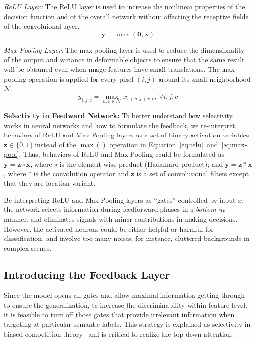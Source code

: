 \emph{ReLU Layer:}
The ReLU layer is used to increase the nonlinear properties of the decision function and of the overall network without affecting the receptive fields of the convoluional layer.
\begin{equation}
\mathbf{y} = \max (\mathbf{0}, \mathbf{x})
\label{eq:relu}
\end{equation}

\emph{Max-Pooling Layer:}
The max-pooling layer is used to reduce the dimensionality of the output and variance in deformable objects to ensure that the same result will be obtained even when image features have small translations. The max-pooling operation is applied for every pixel $(i,j)$ around its small neighborhood $\mathcal{N}$.
\begin{equation}
y_{i,j,c} = \max_{u,v \in \mathcal{N}} x_{i+u, j+v, c},\ \forall i, j, c
\label{eq:max-pool}
\end{equation}


\textbf{Selectivity in Feedward Network:}
To better understand how selectivity works in neural networks and how to formulate the feedback, we re-interpret behaviors of ReLU and Max-Pooling layers as a set of binary activation variables $\mathbf{z} \in \{0,1\}$ instead of the $\max()$ operation in Equation~\ref{eq:relu}~and~\ref{eq:max-pool}. Thus, behaviors of ReLU and Max-Pooling could be formulated as $\mathbf{y} = \mathbf{z} \circ \mathbf{x}$, where $\circ$ is the element wise product (Hadamard product); and $\mathbf{y} = \mathbf{z} * \mathbf{x}$, where $*$ is the convolution operator and $\mathbf{z}$ is a set of convolutional filters except that they are location variant.

Be interpreting ReLU and Max-Pooling layers as ``gates'' controlled by input $x$, the network selects information during feedforward phases in a \emph{bottom-up} manner, and eliminates signals with minor contributions in making decisions. However, the activated neurons could be either helpful or harmful for classification, and involve too many noises, for instance, cluttered backgrounds in complex scenes.

\subsection{Introducing the Feedback Layer}
Since the model opens all gates and allow maximal information getting through to ensure the generalization, to increase the discriminability within feature level, it is feasible to turn off those gates that provide irrelevant information when targeting at particular semantic labels. This strategy is explained as selectivity in biased competition theory~\cite{desimone1995neural} and is critical to realize the top-down attention.

